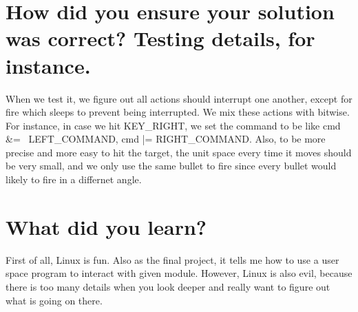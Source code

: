 \documentclass[12pt,letterpaper]{article}
\begin{document}
\section{How did you ensure your solution was correct? Testing details, for instance.}

\indent When we test it, we figure out all actions should interrupt one another, except for fire which sleeps to prevent being interrupted. We mix these actions with bitwise. For instance, in case we hit KEY\_RIGHT, we set the command to be like cmd \&= ~LEFT\_COMMAND, cmd |= RIGHT\_COMMAND. Also, to be more precise and more easy to hit the target, the unit space every time it moves should be very small, and we only use the same bullet to fire since every bullet would likely to fire in a differnet angle.

\section{What did you learn?}

\indent First of all, Linux is fun. Also as the final project, it tells me how to use a user space program to interact with given module. However, Linux is also evil, because there is too many details when you look deeper and really want to figure out what is going on there.
\end{document}
